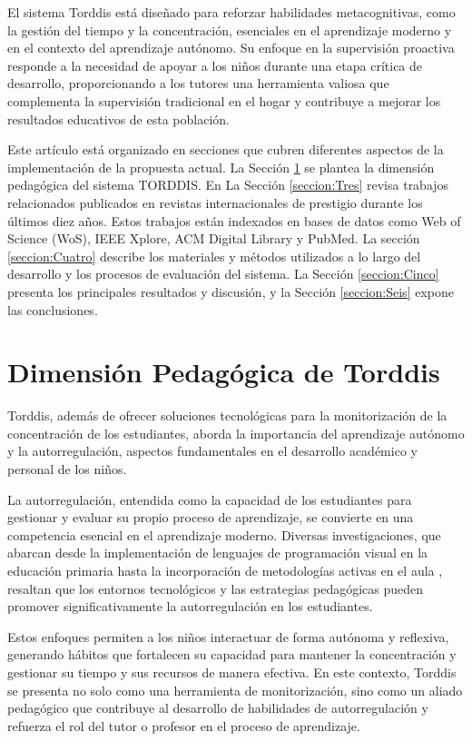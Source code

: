 \documentclass[a4paper,fleqn]{cas-sc}
\begin{document}
		El sistema Torddis está diseñado para reforzar habilidades metacognitivas, como la gestión del tiempo y la concentración, esenciales en el aprendizaje moderno y en el contexto del aprendizaje autónomo. Su enfoque en la supervisión proactiva responde a la necesidad de apoyar a los niños durante una etapa crítica de desarrollo, proporcionando a los tutores una herramienta valiosa que complementa la supervisión tradicional en el hogar y contribuye a mejorar los resultados educativos de esta población.
		
		Este artículo está organizado en secciones que cubren diferentes aspectos de la implementación de la propuesta actual. La Sección \ref{seccion:Dos} se plantea la dimensión pedagógica del sistema TORDDIS. En La Sección \ref{seccion:Tres} revisa trabajos relacionados publicados en revistas internacionales de prestigio durante los últimos diez años. Estos trabajos están indexados en bases de datos como Web of Science (WoS), IEEE Xplore, ACM Digital Library y PubMed. La sección \ref{seccion:Cuatro} describe los materiales y métodos utilizados a lo largo del desarrollo y los procesos de evaluación del sistema. La Sección \ref{seccion:Cinco} presenta los principales resultados y discusión, y la Sección \ref{seccion:Seis} expone las conclusiones.
		
	\section{Dimensión Pedagógica de Torddis}
	\label{seccion:Dos}	
		Torddis, además de ofrecer soluciones tecnológicas para la monitorización de la concentración de los estudiantes, aborda la importancia del aprendizaje autónomo y la autorregulación, aspectos fundamentales en el desarrollo académico y personal de los niños.
		
		La autorregulación, entendida como la capacidad de los estudiantes para gestionar y evaluar su propio proceso de aprendizaje, se convierte en una competencia esencial en el aprendizaje moderno. Diversas investigaciones, que abarcan desde la implementación de lenguajes de programación visual en la educación primaria \citep{SaezLopez2016Visual} hasta la incorporación de metodologías activas en el aula \citep{Mohamed2018Implementing}, resaltan que los entornos tecnológicos y las estrategias pedagógicas pueden promover significativamente la autorregulación en los estudiantes.
		
		Estos enfoques permiten a los niños interactuar de forma autónoma y reflexiva, generando hábitos que fortalecen su capacidad para mantener la concentración y gestionar su tiempo y sus recursos de manera efectiva. En este contexto, Torddis se presenta no solo como una herramienta de monitorización, sino como un aliado pedagógico que contribuye al desarrollo de habilidades de autorregulación y refuerza el rol del tutor o profesor en el proceso de aprendizaje.
		
\end{document}

